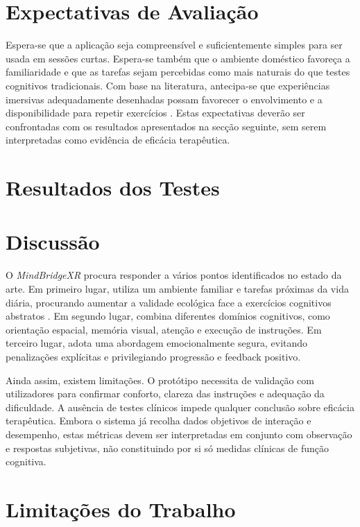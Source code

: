 \documentclass[12pt,a4paper,oneside]{report}
\begin{document}
\section{Expectativas de Avaliação}

Espera-se que a aplicação seja compreensível e suficientemente simples para ser usada em sessões curtas. Espera-se também que o ambiente doméstico favoreça a familiaridade e que as tarefas sejam percebidas como mais naturais do que testes cognitivos tradicionais. Com base na literatura, antecipa-se que experiências imersivas adequadamente desenhadas possam favorecer o envolvimento e a disponibilidade para repetir exercícios \cite{goncalves2025,yun2020}. Estas expectativas deverão ser confrontadas com os resultados apresentados na secção seguinte, sem serem interpretadas como evidência de eficácia terapêutica.

\section{Resultados dos Testes}


\section{Discussão}

O \textit{MindBridgeXR} procura responder a vários pontos identificados no estado da arte. Em primeiro lugar, utiliza um ambiente familiar e tarefas próximas da vida diária, procurando aumentar a validade ecológica face a exercícios cognitivos abstratos \cite{xiong2024}. Em segundo lugar, combina diferentes domínios cognitivos, como orientação espacial, memória visual, atenção e execução de instruções. Em terceiro lugar, adota uma abordagem emocionalmente segura, evitando penalizações explícitas e privilegiando progressão e feedback positivo.

Ainda assim, existem limitações. O protótipo necessita de validação com utilizadores para confirmar conforto, clareza das instruções e adequação da dificuldade. A ausência de testes clínicos impede qualquer conclusão sobre eficácia terapêutica. Embora o sistema já recolha dados objetivos de interação e desempenho, estas métricas devem ser interpretadas em conjunto com observação e respostas subjetivas, não constituindo por si só medidas clínicas de função cognitiva.

\section{Limitações do Trabalho}
\end{document}
